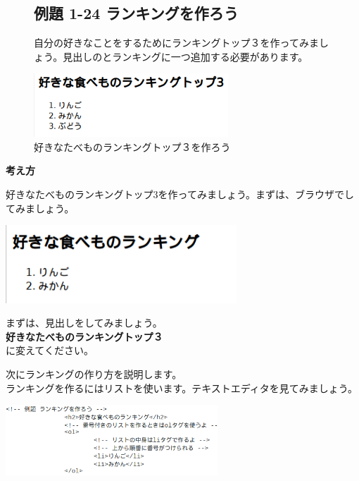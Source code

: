 \begin{figure}
  \subsection{例題 1-24 ランキングを作ろう}
  自分の好きなことをするためにランキングトップ３を作ってみましょう。見出しのとランキングに一つ追加する必要があります。

  \begin{minipage}{\textwidth}
    {\upshape
      \includegraphics[width=0.65\textwidth]{text01-img/textbook-img178.png}
      \newline
      \caption{好きなたべものランキングトップ３を作ろう}
    }
  \end{minipage}  
\end{figure}


\bigskip

\textbf{考え方}

\bigskip

好きなたべものランキングトップ3を作ってみましょう。まずは、ブラウザでしてみましょう。


\bigskip

\includegraphics[width=0.65\textwidth]{text01-img/textbook-img179.png}

\bigskip

まずは、見出しをしてみましょう。\\
\textbf{好きなたべものランキングトップ３}\\
に変えてください。


\bigskip

次にランキングの作り方を説明します。\\
ランキングを作るにはリストを使います。テキストエディタを見てみましょう。

\centering
\includegraphics[width=0.6\textwidth]{text01-img/textbook-img180.png}

